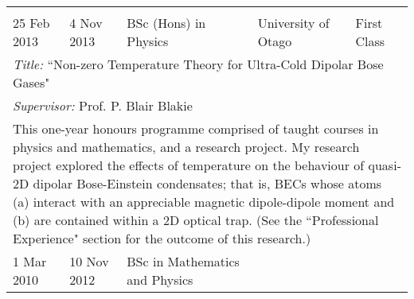 \documentclass[10pt,a4paper,final]{article}
\begin{document}
\begin{tabularx}{\textwidth}{l l l l l}
{   }                                                                                                                                                                                                                                                                 \\
   \rowcolor{seaborn_bg_grey} 25 Feb 2013                                                                             & 4 Nov 2013                                                               & BSc (Hons) in Physics  & University of Otago     & First Class    \\
   \multicolumn{5}{X}{\cellcolor{seaborn_bg_grey}%
      \textit{Title:} ``Non-zero Temperature Theory for Ultra-Cold Dipolar Bose Gases"
   }                                                                                                                                                                                                                                                                 \\
   \multicolumn{5}{X}{\cellcolor{seaborn_bg_grey}%
      \textit{Supervisor:} Prof. P. Blair Blakie
   }                                                                                                                                                                                                                                                                 \\
   \multicolumn{5}{X}{\cellcolor{seaborn_bg_grey}%
      This one-year honours programme comprised of taught courses in physics and mathematics, and a research project. My research project explored the effects of temperature on the behaviour of quasi-2D dipolar Bose-Einstein condensates; that is, BECs whose atoms (a) interact with an appreciable magnetic dipole-dipole moment and (b) are contained within a 2D optical trap. (See the ``Professional Experience" section for the outcome of this research.)
   }                                                                                                                                                                                                                                                                 \\
   \rowcolor{seaborn_bg_grey_half}
   1 Mar 2010                                                                                                         & 10 Nov 2012                                                              &
   \multicolumn{1}{m{0.26\textwidth}}{BSc in Mathematics and Physics}                                                 &

\end{tabularx}
\end{document}
